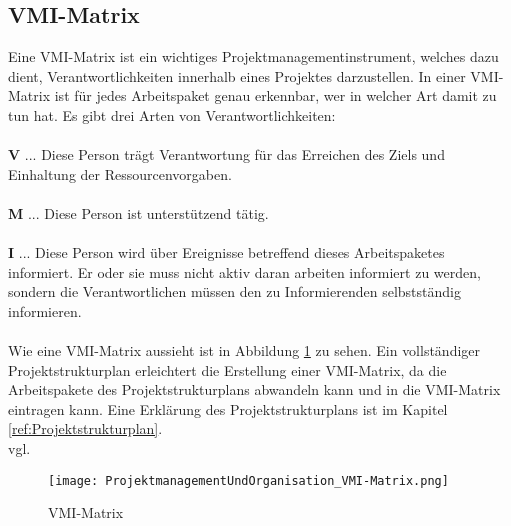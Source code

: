 \subsection{VMI-Matrix}
\label{sec:VMI-Matrix}
Eine VMI-Matrix ist ein wichtiges Projektmanagementinstrument, welches dazu dient, Verantwortlichkeiten innerhalb eines Projektes darzustellen. In einer VMI-Matrix ist für jedes Arbeitspaket genau erkennbar, wer in welcher Art damit zu tun hat. Es gibt drei Arten von Verantwortlichkeiten: \\ \\
\textbf{V} ... Diese Person trägt Verantwortung für das Erreichen des Ziels und Einhaltung der Ressourcenvorgaben.\\ \\
\textbf{M} ... Diese Person ist unterstützend tätig.\\ \\
\textbf{I} ... Diese Person wird über Ereignisse betreffend dieses Arbeitspaketes informiert. Er oder sie muss nicht aktiv daran arbeiten informiert zu werden, sondern die Verantwortlichen müssen den zu Informierenden selbstständig informieren.\\ \\
Wie eine VMI-Matrix aussieht ist in Abbildung \ref{fig:vmi-Matrix} zu sehen. Ein vollständiger Projektstrukturplan erleichtert die Erstellung einer VMI-Matrix, da die Arbeitspakete des Projektstrukturplans abwandeln kann und in die VMI-Matrix eintragen kann. Eine Erklärung des Projektstrukturplans ist im Kapitel \ref{ref:Projektstrukturplan}.\\vgl. 
\textcite{VMI-Matrix}\\

\begin{figure}[H]
	\texttt{[image: ProjektmanagementUndOrganisation\_VMI-Matrix.png]}
    \caption{VMI-Matrix}
    \label{fig:vmi-Matrix}
\end{figure}


\pagebreak	
		
